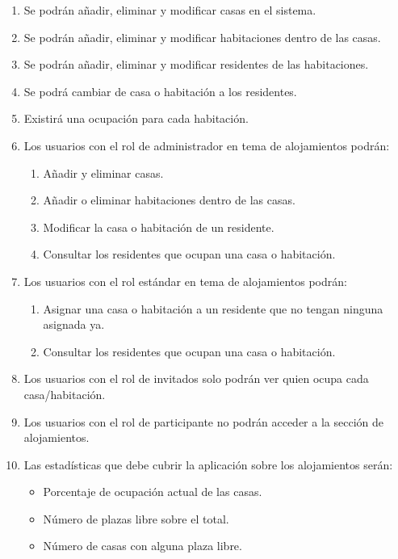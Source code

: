\begin{enumerate}[start=26,label={RF-\arabic*.}]

    \item Se podrán añadir, eliminar y modificar casas en el sistema.
    \item Se podrán añadir, eliminar y modificar habitaciones dentro de las casas.
    \item Se podrán añadir, eliminar y modificar residentes de las habitaciones.
    \item Se podrá cambiar de casa o habitación a los residentes.
    \item Existirá una ocupación para cada habitación.
    \item Los usuarios con el rol de administrador en tema de alojamientos podrán:
        \begin{enumerate}
            \item Añadir y eliminar casas.
            \item Añadir o eliminar habitaciones dentro de las casas.
            \item Modificar la casa o habitación de un residente.
            \item Consultar los residentes que ocupan una casa o habitación.
        \end{enumerate}
    \item Los usuarios con el rol estándar en tema de alojamientos podrán:
        \begin{enumerate}
            \item Asignar una casa o habitación a un residente que no tengan ninguna asignada ya.
            \item Consultar los residentes que ocupan una casa o habitación. 
        \end{enumerate}
    \item Los usuarios con el rol de invitados solo podrán ver quien ocupa cada casa/habitación.
    \item Los usuarios con el rol de participante no podrán acceder a la sección de alojamientos.
    \item \label{rf-es-ocupacion} Las estadísticas que debe cubrir la aplicación sobre los alojamientos serán:
        \begin{itemize}
            \item Porcentaje de ocupación actual de las casas.
            \item Número de plazas libre sobre el total.
            \item Número de casas con alguna plaza libre.
        \end{itemize}    

\end{enumerate}

